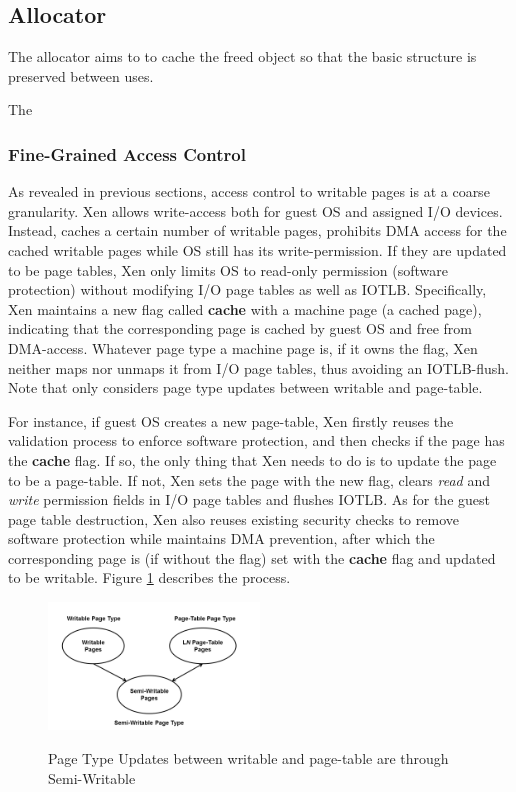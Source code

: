 \subsection{\name Allocator}
The \name allocator aims to to cache the freed object so that the basic structure is preserved between uses.

The


\subsubsection{Fine-Grained Access Control}

As revealed in previous sections, access control to writable pages is at a coarse granularity. Xen allows write-access both for guest OS and assigned I/O devices. Instead, \name caches a certain number of writable pages, prohibits DMA access for the cached writable pages while OS still has its write-permission. If they are updated to be page tables, Xen only limits OS to read-only permission (software protection) without modifying I/O page tables as well as IOTLB. Specifically, Xen maintains a new flag called \textbf{cache} with a machine page (a cached page), indicating that the corresponding page is cached by guest OS and free from DMA-access. Whatever page type a machine page is, if it owns the flag, Xen neither maps nor unmaps it from I/O page tables, thus avoiding an IOTLB-flush. Note that \name only considers page type updates between writable and page-table.

For instance, if guest OS creates a new page-table, Xen firstly reuses the validation process to enforce software protection, and then checks if the page has the \textbf{cache} flag. If so, the only thing that Xen needs to do is to update the page to be a page-table. If not, Xen sets the page with the new flag, clears \emph{read} and \emph{write} permission fields in I/O page tables and flushes IOTLB. As for the guest page table destruction, Xen also reuses existing security checks to remove software protection while maintains DMA prevention, after which the corresponding page is (if without the flag) set with the \textbf{cache} flag and updated to be writable. Figure \ref{fig:semi-type} describes the process.

\begin{figure}[ht]
\centering
\includegraphics[width=0.5\textwidth]{image/overview/page-type-updates-with-semi-type.png} \\
\caption{Page Type Updates between writable and page-table are through Semi-Writable}
\label{fig:semi-type}
\end{figure}

